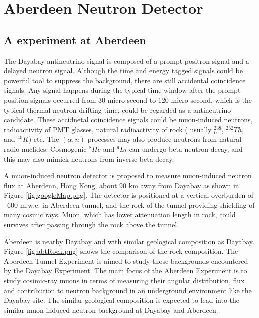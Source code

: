 \chapter{Aberdeen Neutron Detector}
\section{A experiment at Aberdeen}

The Dayabay antineutrino signal is composed of a prompt positron signal and a delayed
neutron signal. Although the time and energy tagged signals could be powerful tool to suppress
the background, there are still accidental coincidence signals. Any signal happens during
the typical time window after the prompt position signals occurred from 30 micro-second to 120 micro-second,
which is the typical thermal neutron drifting time, 
could be regarded as a antineutrino candidate. These accidnetal coincidence signals could be
muon-induced neutrons, radioactivity of PMT glasses, natural radioactivity of rock
( usually $^{238}_U$, $^{232}Th$, and $^{40}K$) etc. The $(\alpha,n)$ processes may also produce
neutrons from natural radio-nuclides. Cosmogenic $^8He$ and $^9Li$ can undergo beta-neutron decay,
and this may also mimick neutrons from inverse-beta decay.


A muon-induced neutron detector is proposed to measure muon-induced neutron flux at Aberdenn, Hong Kong,
about 90 km away from Dayabay as shown in Figure \ref{fig:googleMap.png}.
The detector is positioned at a vertical overburden of ~600 m.w.e. in Aberdeen tunnel, and the rock of the tunnel
providing shielding of many cosmic rays. Muon, which has lower attenuation length in rock, could
survives after passing through the rock above the tunnel.

Aberdeen is nearby Dayabay and with similar geological composition as Dayabay. Figure \ref{fig:abtRock.png}
shows the comparison of the rock composition.
The Aberdeen Tunnel Experiment is aimed to study those backgrounds encountered by the Dayabay
Experiment. The main focus of the Aberdeen Experiment is to study cosimic-ray muons in terms
of measuring their angular distribution, flux and contribution to neutron background in an
underground environment like the Dayabay site. The similar geological composition
is expected to lead into the similar muon-induced neutron background at Dayabay and Aberdeen.


